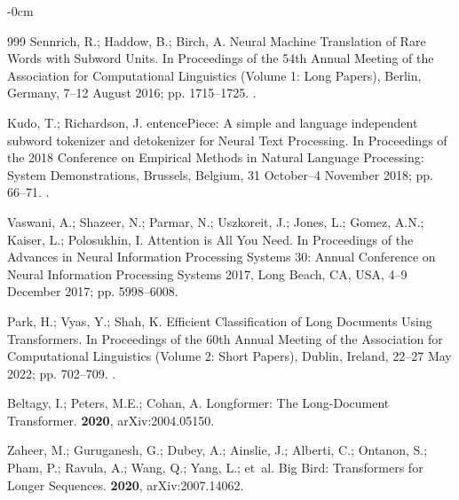 \documentclass[make,article,accept,pdftex,moreauthors]{Definitions/mdpi}
\begin{document}
\begin{adjustwidth}{-\extralength}{0cm}
\begin{thebibliography}{999}
Sennrich, R.; Haddow, B.; Birch, A.
\newblock Neural Machine Translation of Rare Words with Subword Units.
\newblock In Proceedings of the 54th Annual Meeting of the
  Association for Computational Linguistics (Volume 1: Long Papers), Berlin,
  Germany, 7--12 August 2016; pp. 1715--1725.
.

Kudo, T.; Richardson, J.
entence{P}iece: A simple and language independent subword
  tokenizer and detokenizer for Neural Text Processing.
\newblock In Proceedings of the 2018 Conference on Empirical
  Methods in Natural Language Processing: System Demonstrations, Brussels,
  Belgium, 31 October--4 November 2018; pp. 66--71.
.

Vaswani, A.; Shazeer, N.; Parmar, N.; Uszkoreit, J.; Jones, L.; Gomez, A.N.;
  Kaiser, L.; Polosukhin, I.
\newblock Attention is All You Need.
\newblock In Proceedings of the Advances in Neural Information Processing
  Systems 30: Annual Conference on Neural Information Processing Systems 2017, Long Beach, CA, USA,
  4--9 December 2017;
 pp. 5998--6008.

Park, H.; Vyas, Y.; Shah, K.
\newblock Efficient Classification of Long Documents Using Transformers.
\newblock In Proceedings of the 60th Annual Meeting of the
  Association for Computational Linguistics (Volume 2: Short Papers), Dublin, Ireland, 22--27 May 2022; pp. 702--709.
.

Beltagy, I.; Peters, M.E.; Cohan, A.
\newblock Longformer: The Long-Document Transformer.
 {\bf 2020}, arXiv:2004.05150.

Zaheer, M.; Guruganesh, G.; Dubey, A.; Ainslie, J.; Alberti, C.; Ontanon, S.;
  Pham, P.; Ravula, A.; Wang, Q.; Yang, L.;  et~al.
\newblock Big Bird: Transformers for Longer Sequences.
 {\bf 2020}, arXiv:2007.14062.


\end{thebibliography}
\end{adjustwidth}
\end{document}
